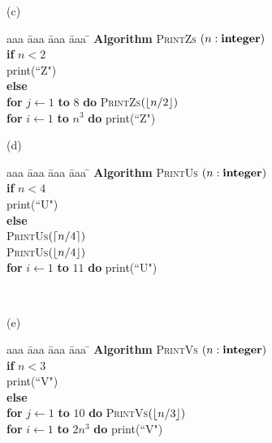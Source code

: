 \documentclass{article}
\begin{document}
\begin{problem}
\bigskip
\noindent
(c)\ \ 
\begin{minipage}[t]{3in}
\begin{tabbing}
aaa \= aaa \= aaa \= aaa \=  \kill
\textbf{Algorithm} \textsc{PrintZs} $(n: \mbox{\bf integer})$ \\
          \> \textbf{if} $n < 2$ \\
          \>\>  print(``Z") \\
          \>\textbf{else} \\
          \>\>  \textbf{for} $j \leftarrow 1$ \textbf{to} $8$ 
					\textbf{do} \textsc{PrintZs}$({\left\lfloor n/2\right\rfloor})$\\
      \>\> \textbf{for} $i \leftarrow 1$ \textbf{to} $n^3$ \textbf{do} print(``Z")
\end{tabbing}
\end{minipage}

\bigskip
\noindent
(d)\ \ 
\begin{minipage}[t]{3in}
\begin{tabbing}
aaa \= aaa \= aaa \= aaa \=  \kill
\textbf{Algorithm} \textsc{PrintUs} $(n: \mbox{\bf integer})$ \\
          \> \textbf{if} $n < 4$ \\
          \>\>  print(``U") \\
          \>\textbf{else} \\
          \>\>  \textsc{PrintUs}$({\left\lceil n/4\right\rceil})$\\
          \>\>  \textsc{PrintUs}$({\left\lfloor n/4\right\rfloor})$\\
      \>\> \textbf{for} $i \leftarrow 1$ \textbf{to} $11$ \textbf{do} print(``U")
\end{tabbing}
\end{minipage}
\bigskip
\ 


\bigskip
\noindent
(e)\ \ 
\begin{minipage}[t]{3in}
\begin{tabbing}
aaa \= aaa \= aaa \= aaa \=  \kill
\textbf{Algorithm} \textsc{PrintVs} $(n: \mbox{\bf integer})$ \\
          \> \textbf{if} $n < 3$ \\
          \>\>  print(``V") \\
          \>\textbf{else} \\
          \>\>  \textbf{for} $j \leftarrow 1$ \textbf{to} $10$ 
					\textbf{do} \textsc{PrintVs}$({\left\lfloor n/3\right\rfloor})$\\
      \>\> \textbf{for} $i \leftarrow 1$ \textbf{to} $2n^3$ \textbf{do} print(``V")
\end{tabbing}
\end{minipage}
\bigskip
\


\end{problem}
\end{document}
